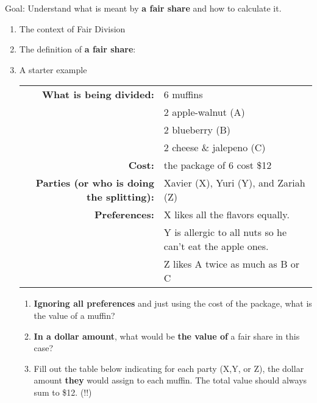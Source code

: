 \documentclass[12pt]{article}
\begin{document}
Goal: Understand what is meant by \textbf{a fair share} and how to calculate it.
\begin{enumerate}
\item The context of Fair Division
\vfill
\item The definition of \textbf{a fair share}:\\
\vfill
\newpage
\item A starter example \\


\begin{tabular}{rl}
\textbf{What is being divided:}& 6 muffins \\
&2 apple-walnut (A)\\
&2 blueberry (B)\\
&2 cheese \& jalepeno (C)\\[6pt]
\textbf{Cost:}& the package of 6 cost \$12\\[6pt]
\textbf{Parties (or who is doing the splitting):}& Xavier (X), Yuri (Y), and Zariah (Z) \\[6pt]
\textbf{Preferences:}& X likes all the flavors equally.\\
& Y is allergic to all nuts so he can't eat the apple ones.\\
& Z likes A twice as much as B or C\\
\end{tabular}

	\begin{enumerate}
	\item \textbf{Ignoring all preferences} and just using the cost of the package, what is the value of a muffin?
	\vfill
	\item \textbf{In a dollar amount}, what would be \textbf{the value of} a fair share in this case?
	\vfill
	\item Fill out the table below indicating for each party (X,Y, or Z), the dollar amount \textbf{they} would assign to each muffin. The total value should always sum to \$12. (!!)\\
	

\end{enumerate}
\end{enumerate}
\end{document}
